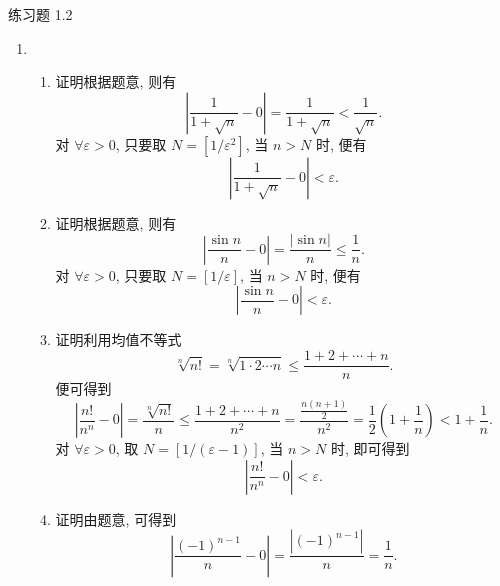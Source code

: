 



% 

\begin{center}
    {\heiti 练习题 1.2}
\end{center}

\begin{enumerate}
    \item %
        \begin{enumerate}[(1)]
            \item %
                {\heiti 证明}\quad 根据题意, 则有
                \[
                    \left|\frac{1}{1+\sqrt{n}} - 0\right| = \frac{1}{1+\sqrt{n}} < \frac{1}{\sqrt{n}}.    
                \]
                对 $\forall\varepsilon > 0$, 只要取 $N = [1/\varepsilon^2]$, 当 $n > N$ 时, 便有
                \[
                    \left|\frac{1}{1+\sqrt{n}} - 0\right| < \varepsilon. 
                \]
            \item %
                {\heiti 证明}\quad 根据题意, 则有
                \[
                    \left|\frac{\sin n}{n} - 0\right| = \frac{|\sin n|}{n} \leqslant \frac1n.    
                \]
                对 $\forall\varepsilon > 0$, 只要取 $N = [1/\varepsilon]$, 当 $n > N$ 时, 便有
                \[
                    \left|\frac{\sin n}{n} - 0\right| < \varepsilon.    
                \]
            \item %
                {\heiti 证明}\quad 利用均值不等式
                \[
                    \sqrt[n]{n!} = \sqrt[n]{1\cdot2\cdots n} \leqslant \frac{1 + 2 + \cdots + n}{n}.   
                \]
                便可得到
                \[
                    \left|\frac{n!}{n^n} - 0\right| = \frac{\sqrt[n]{n!}}{n} \leqslant \frac{1+2+\cdots+n}{n^2} = \frac{\frac{n(n+1)}{2}}{n^2} = \frac12\left(1 + \frac1n\right) < 1 + \frac1n.
                \]
                对 $\forall\varepsilon > 0$, 取 $N = [1/(\varepsilon-1)]$, 当 $n > N$ 时, 即可得到
                \[
                    \left|\frac{n!}{n^n} - 0\right| < \varepsilon.   
                \]
            \item %
                {\heiti 证明}\quad 由题意, 可得到
                \[
                    \left|\frac{(-1)^{n-1}}{n} - 0\right| = \frac{|(-1)^{n-1}|}{n} = \frac1n.    
\]
\end{enumerate}
\end{enumerate}
